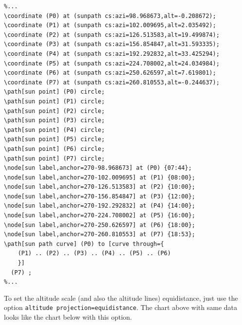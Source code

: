 \begin{verbatim}
%...
\coordinate (P0) at (sunpath cs:azi=98.968673,alt=-0.208672);
\coordinate (P1) at (sunpath cs:azi=102.009695,alt=2.035492);
\coordinate (P2) at (sunpath cs:azi=126.513583,alt=19.499874);
\coordinate (P3) at (sunpath cs:azi=156.854847,alt=31.593335);
\coordinate (P4) at (sunpath cs:azi=192.292832,alt=33.425294);
\coordinate (P5) at (sunpath cs:azi=224.708002,alt=24.034984);
\coordinate (P6) at (sunpath cs:azi=250.626597,alt=7.619801);
\coordinate (P7) at (sunpath cs:azi=260.810553,alt=-0.244637);
\path[sun point] (P0) circle;
\path[sun point] (P1) circle;
\path[sun point] (P2) circle;
\path[sun point] (P3) circle;
\path[sun point] (P4) circle;
\path[sun point] (P5) circle;
\path[sun point] (P6) circle;
\path[sun point] (P7) circle;
\node[sun label,anchor=270-98.968673] at (P0) {07:44};
\node[sun label,anchor=270-102.009695] at (P1) {08:00};
\node[sun label,anchor=270-126.513583] at (P2) {10:00};
\node[sun label,anchor=270-156.854847] at (P3) {12:00};
\node[sun label,anchor=270-192.292832] at (P4) {14:00};
\node[sun label,anchor=270-224.708002] at (P5) {16:00};
\node[sun label,anchor=270-250.626597] at (P6) {18:00};
\node[sun label,anchor=270-260.810553] at (P7) {18:53};
\path[sun path curve] (P0) to [curve through={ 
    (P1) .. (P2) .. (P3) .. (P4) .. (P5) .. (P6) 
    }] 
  (P7) ;
%...
\end{verbatim}

To set the altitude scale (and also the altitude lines) equidistance, just use the option \verb|altitude projection=equidistance|.
The chart above with same data looks like the chart below with this option.

